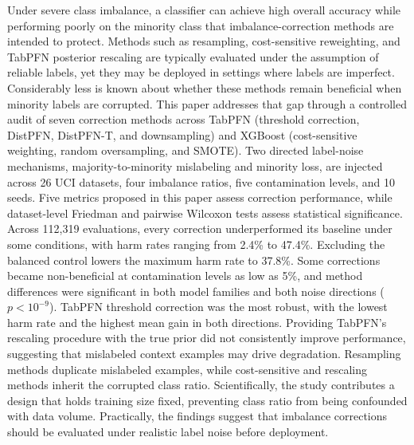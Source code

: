 Under severe class imbalance, a classifier can achieve high overall accuracy
while performing poorly on the minority class that imbalance-correction
methods are intended to protect. Methods such as resampling, cost-sensitive
reweighting, and TabPFN posterior rescaling are typically evaluated under the
assumption of reliable labels, yet they may be deployed in settings where
labels are imperfect. Considerably less is known about whether these methods
remain beneficial when minority labels are corrupted. This paper addresses
that gap through a controlled audit of seven correction methods across TabPFN
(threshold correction, DistPFN, DistPFN-T, and downsampling) and XGBoost
(cost-sensitive weighting, random oversampling, and SMOTE). Two directed
label-noise mechanisms, majority-to-minority mislabeling and minority loss,
are injected across 26 UCI datasets, four imbalance ratios, five contamination
levels, and 10 seeds. Five metrics proposed in this paper assess correction
performance, while dataset-level Friedman and pairwise Wilcoxon tests assess
statistical significance. Across 112{,}319 evaluations, every correction
underperformed its baseline under some conditions, with harm rates ranging
from 2.4\% to 47.4\%. Excluding the balanced control lowers the maximum harm
rate to 37.8\%. Some corrections became non-beneficial at contamination levels
as low as 5\%, and method differences were significant in both model families
and both noise directions ($p < 10^{-9}$). TabPFN threshold correction was the
most robust, with the lowest harm rate and the highest mean gain in both
directions. Providing TabPFN's rescaling procedure with the true prior did not
consistently improve performance, suggesting that mislabeled context examples
may drive degradation. Resampling methods duplicate mislabeled examples, while
cost-sensitive and rescaling methods inherit the corrupted class ratio.
Scientifically, the study contributes a design that holds training size fixed,
preventing class ratio from being confounded with data volume. Practically,
the findings suggest that imbalance corrections should be evaluated under
realistic label noise before deployment.
